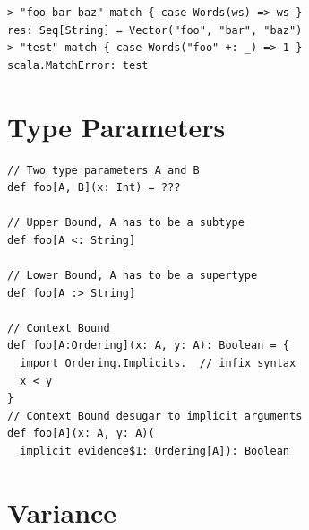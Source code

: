 \documentclass[10pt,landscape,a4paper]{article}
\begin{document}
\begin{multicols*}{4}
\begin{verbatim}
> "foo bar baz" match { case Words(ws) => ws }
res: Seq[String] = Vector("foo", "bar", "baz")
> "test" match { case Words("foo" +: _) => 1 }
scala.MatchError: test
\end{verbatim}

  \section{Type Parameters}

\begin{verbatim}
// Two type parameters A and B
def foo[A, B](x: Int) = ???

// Upper Bound, A has to be a subtype
def foo[A <: String]

// Lower Bound, A has to be a supertype
def foo[A :> String]

// Context Bound
def foo[A:Ordering](x: A, y: A): Boolean = {
  import Ordering.Implicits._ // infix syntax
  x < y
}
// Context Bound desugar to implicit arguments
def foo[A](x: A, y: A)(
  implicit evidence$1: Ordering[A]): Boolean
\end{verbatim}

  \section{Variance}

  \begin{center}
  \end{center}


\end{multicols*}
\end{document}
